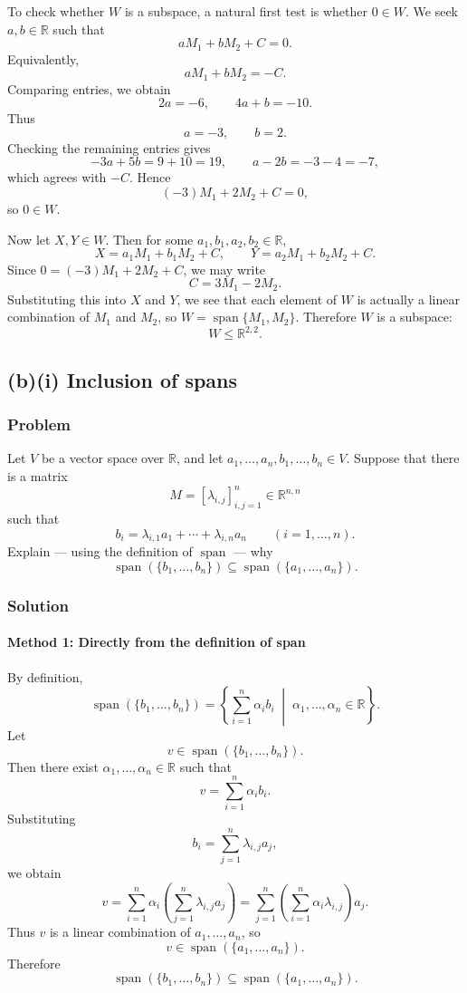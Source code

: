 \documentclass[12pt]{article}
\newcommand{\R}{\mathbb{R}}
\newcommand{\Span}{\operatorname{span}}
\begin{document}
To check whether \(W\) is a subspace, a natural first test is whether \(0\in W\). We seek \(a,b\in\R\) such that
\[
aM_1+bM_2+C=0.
\]
Equivalently,
\[
aM_1+bM_2=-C.
\]
Comparing entries, we obtain
\[
2a=-6,\qquad 4a+b=-10.
\]
Thus
\[
a=-3,\qquad b=2.
\]
Checking the remaining entries gives
\[
-3a+5b=9+10=19,\qquad a-2b=-3-4=-7,
\]
which agrees with \(-C\). Hence
\[
(-3)M_1+2M_2+C=0,
\]
so \(0\in W\).

Now let \(X,Y\in W\). Then for some \(a_1,b_1,a_2,b_2\in\R\),
\[
X=a_1M_1+b_1M_2+C,\qquad
Y=a_2M_1+b_2M_2+C.
\]
Since \(0=(-3)M_1+2M_2+C\), we may write
\[
C=3M_1-2M_2.
\]
Substituting this into \(X\) and \(Y\), we see that each element of \(W\) is actually a linear combination of \(M_1\) and \(M_2\), so \(W=\Span\{M_1,M_2\}\). Therefore \(W\) is a subspace:
\[
\boxed{W\le \R^{2,2}.}
\]

\bigskip

\subsection{(b)(i) Inclusion of spans}
\subsubsection{Problem}
Let \(V\) be a vector space over \(\R\), and let \(a_1,\ldots,a_n,b_1,\ldots,b_n\in V\). Suppose that there is a matrix
\[
M=[\lambda_{i,j}]_{i,j=1}^n\in \R^{n,n}
\]
such that
\[
b_i=\lambda_{i,1}a_1+\cdots+\lambda_{i,n}a_n
\qquad (i=1,\ldots,n).
\]
Explain --- using the definition of \(\Span\) --- why
\[
\Span(\{b_1,\ldots,b_n\})\subseteq \Span(\{a_1,\ldots,a_n\}).
\]

\subsubsection{Solution}

\paragraph{Method 1: Directly from the definition of span}
By definition,
\[
\Span(\{b_1,\ldots,b_n\})
=
\left\{
\sum_{i=1}^n \alpha_i b_i \;\middle|\; \alpha_1,\ldots,\alpha_n\in\R
\right\}.
\]
Let
\[
v\in \Span(\{b_1,\ldots,b_n\}).
\]
Then there exist \(\alpha_1,\ldots,\alpha_n\in\R\) such that
\[
v=\sum_{i=1}^n \alpha_i b_i.
\]
Substituting
\[
b_i=\sum_{j=1}^n \lambda_{i,j}a_j,
\]
we obtain
\[
v=\sum_{i=1}^n \alpha_i\left(\sum_{j=1}^n \lambda_{i,j}a_j\right)
=\sum_{j=1}^n\left(\sum_{i=1}^n \alpha_i\lambda_{i,j}\right)a_j.
\]
Thus \(v\) is a linear combination of \(a_1,\ldots,a_n\), so
\[
v\in \Span(\{a_1,\ldots,a_n\}).
\]
Therefore
\[
\boxed{\Span(\{b_1,\ldots,b_n\})\subseteq \Span(\{a_1,\ldots,a_n\}).}
\]
\end{document}
